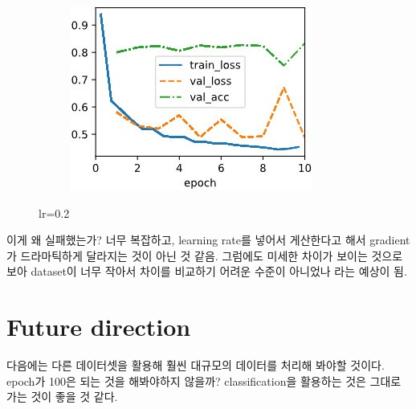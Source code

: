 \documentclass{article}
\begin{document}
\begin{figure}[ht]
\begin{center}
\begin{subfigure}[b]{0.3\columnwidth}
\includegraphics[width=\columnwidth]{img/lr0.2 cosine0.01.jpg}
\end{subfigure}
\caption{lr=0.2}
\label{lr:0.2}
\end{center}
\vskip -0.2in
\end{figure}
이게 왜 실패했는가? 너무 복잡하고, learning rate를 넣어서 게산한다고 해서 gradient가 드라마틱하게 달라지는 것이 아닌 것 같음. 그럼에도 미세한 차이가 보이는 것으로 보아 dataset이 너무 작아서 차이를 비교하기 어려운 수준이 아니었나 라는 예상이 됨.


\section{Future direction}
다음에는 다른 데이터셋을 활용해 훨씬 대규모의 데이터를 처리해 봐야할 것이다. epoch가 100은 되는 것을 해봐야하지 않을까?
classification을 활용하는 것은 그대로 가는 것이 좋을 것 같다.



\clearpage
\end{document}
